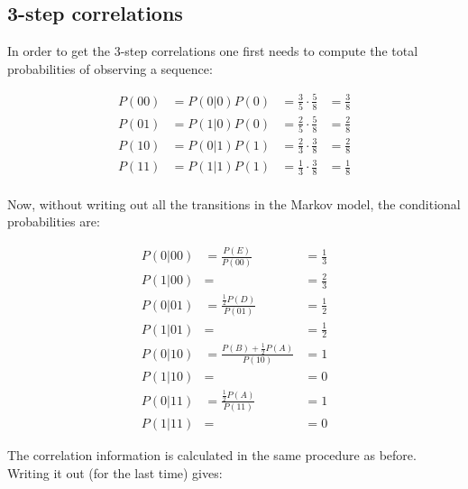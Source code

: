 \documentclass[12pt]{scrartcl}
\begin{document}
\subsection{3-step correlations}

In order to get the 3-step correlations one first needs to compute the total probabilities of observing a sequence:

\begin{equation}\begin{aligned}
P(00) &= P(0|0) P(0) &= \frac{3}{5} \cdot \frac{5}{8} &= \frac{3}{8}\\
P(01) &= P(1|0) P(0) &= \frac{2}{5} \cdot \frac{5}{8} &= \frac{2}{8}\\
P(10) &= P(0|1) P(1) &= \frac{2}{3} \cdot \frac{3}{8} &= \frac{2}{8}\\
P(11) &= P(1|1) P(1) &= \frac{1}{3} \cdot \frac{3}{8} &= \frac{1}{8}\\
\end{aligned}\end{equation}

Now, without writing out all the transitions in the Markov model, the conditional probabilities are:

\begin{equation}\begin{aligned}
P(0|00) &= \frac{P(E)}{P(00)} &= \frac{1}{3}\\
P(1|00) &= &= \frac{2}{3}\\
P(0|01) &= \frac{\frac{1}{2}P(D)}{P(01)} &= \frac{1}{2}\\
P(1|01) &= &= \frac{1}{2}\\
P(0|10) &= \frac{P(B) + \frac{1}{2}P(A)}{P(10)} &= 1\\
P(1|10) &= &= 0\\
P(0|11) &= \frac{\frac{1}{2}P(A)}{P(11)} &= 1\\
P(1|11) &= &= 0
\end{aligned}\end{equation}

The correlation information is calculated in the same procedure as before. Writing it out (for the last time) gives:
\end{document}
